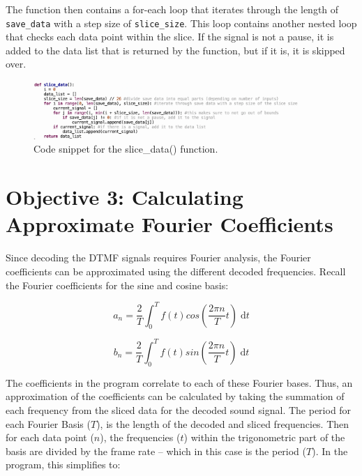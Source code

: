 \documentclass[12pt]{iopart}
\begin{document}
The function then contains a for-each loop that iterates through the length of \verb|save_data| with a step size of \verb|slice_size|.
This loop contains another nested loop that checks each data point within the slice.
If the signal is not a pause, it is added to the data list that is returned by the function, but if it is, it is skipped over. 

\begin{figure}[h!tbp]
  \begin{center}
 \item[]\includegraphics[width=0.9\textwidth]{images/slice_data().png}
  \caption{\label{fig:slice_data()}
  Code snippet for the slice\_data() function.
  }
  \end{center}
\end{figure}

\section{Objective 3: Calculating Approximate Fourier Coefficients}

Since decoding the DTMF signals requires Fourier analysis, the Fourier coefficients can be approximated using the different decoded frequencies. 
Recall the Fourier coefficients for the sine and cosine basis:

\begin{equation}
    a_n = \frac{2}{T}\int_0^T f(t)cos(\frac{2\pi n}{T}t)\;\mathrm{d}t
\end{equation}

\begin{equation}
    b_n = \frac{2}{T}\int_0^T f(t)sin(\frac{2\pi n}{T}t)\;\mathrm{d}t
\end{equation}

The coefficients in the program correlate to each of these Fourier bases. 
Thus, an approximation of the coefficients can be calculated by taking the summation of each frequency from the sliced data for the decoded sound signal. 
The period for each Fourier Basis ($T$), is the length of the decoded and sliced frequencies. 
Then for each data point ($n$), the frequencies ($t$) within the trigonometric part of the basis are divided by the frame rate -- which in this case is the period ($T$). 
In the program, this simplifies to: 
\end{document}
